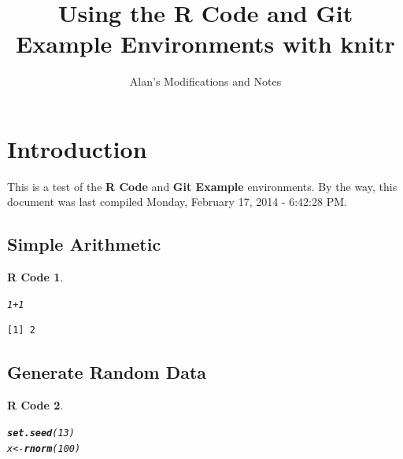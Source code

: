 \documentclass{article}\usepackage[]{graphicx}\usepackage[]{color}
\title{Using the \textbf{R Code} and {\bfseries{Git Example}} Environments with \textbf{knitr}}
\author{Alan's Modifications and Notes}
\makeatletter
\newcommand{\hlnum}[1]{\textcolor[rgb]{0.686,0.059,0.569}{#1}}%
\newcommand{\hlopt}[1]{\textcolor[rgb]{0,0,0}{#1}}%
\newcommand{\hlstd}[1]{\textcolor[rgb]{0.345,0.345,0.345}{#1}}%
\newcommand{\hlkwb}[1]{\textcolor[rgb]{0.69,0.353,0.396}{#1}}%
\newcommand{\hlkwd}[1]{\textcolor[rgb]{0.737,0.353,0.396}{\textbf{#1}}}%
\newenvironment{kframe}{%
 \def\at@end@of@kframe{}%
 \ifinner\ifhmode%
  \def\at@end@of@kframe{\end{minipage}}%
  \begin{minipage}{\columnwidth}%
 \fi\fi%
 \def\FrameCommand##1{\hskip\@totalleftmargin \hskip-\fboxsep
 \colorbox{shadecolor}{##1}\hskip-\fboxsep
     \hskip-\linewidth \hskip-\@totalleftmargin \hskip\columnwidth}%
 \MakeFramed {\advance\hsize-\width
   \@totalleftmargin\z@ \linewidth\hsize
   \@setminipage}}%
 {\par\unskip\endMakeFramed%
 \at@end@of@kframe}
\newenvironment{knitrout}{}{} %
\theoremstyle{rcode}
\newtheorem{rcode}{R Code}[section]
\makeatother
\begin{document}
\maketitle





\section{Introduction}

This is a test of the \textbf{R Code} and \textbf{Git Example} environments.  By the way,
this document was last compiled Monday, February 17, 2014 - 6:42:28 PM.

\subsection{Simple Arithmetic}

\begin{knitrout}
\color{fgcolor}\begin{kframe}
\begin{rcode}\label{test-a}\hfill{}\begin{alltt}
\hlnum{1} \hlopt{+} \hlnum{1}
\end{alltt}
\begin{verbatim}
[1] 2
\end{verbatim}
\end{rcode}\end{kframe}
\end{knitrout}



\subsection{Generate Random Data}

\begin{knitrout}
\color{fgcolor}\begin{kframe}
\begin{rcode}\label{test-b}\hfill{}\begin{alltt}
\hlkwd{set.seed}\hlstd{(}\hlnum{13}\hlstd{)}
\hlstd{x} \hlkwb{<-} \hlkwd{rnorm}\hlstd{(}\hlnum{100}\hlstd{)}
\end{alltt}
\end{rcode}\end{kframe}
\end{knitrout}
\end{document}
